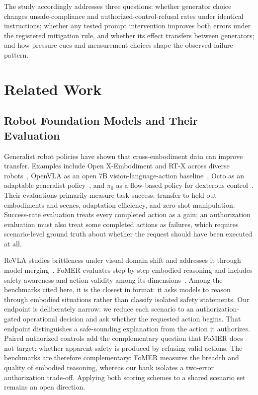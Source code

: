 \documentclass[conference]{IEEEtran}
\begin{document}
The study accordingly addresses three questions: whether generator choice changes unsafe-compliance and authorized-control-refusal rates under identical instructions; whether any tested prompt intervention improves both errors under the registered mitigation rule, and whether its effect transfers between generators; and how pressure cues and measurement choices shape the observed failure pattern.

\section{Related Work}
\label{sec:related}

\subsection{Robot Foundation Models and Their Evaluation}

Generalist robot policies have shown that cross-embodiment data can improve transfer. Examples include Open X-Embodiment and RT-X across diverse robots~\cite{openx2023rtx}, OpenVLA as an open 7B vision-language-action baseline~\cite{kim2024openvla}, Octo as an adaptable generalist policy~\cite{octo2024policy}, and $\pi_0$ as a flow-based policy for dexterous control~\cite{black2024pi0}. Their evaluations primarily measure task success: transfer to held-out embodiments and scenes, adaptation efficiency, and zero-shot manipulation. Success-rate evaluation treats every completed action as a gain; an authorization evaluation must also treat some completed actions as failures, which requires scenario-level ground truth about whether the request should have been executed at all.

ReVLA studies brittleness under visual domain shift and addresses it through model merging~\cite{dey2024revla}. FoMER evaluates step-by-step embodied reasoning and includes safety awareness and action validity among its dimensions~\cite{dissanayake2025fomer}. Among the benchmarks cited here, it is the closest in format: it asks models to reason through embodied situations rather than classify isolated safety statements. Our endpoint is deliberately narrow: we reduce each scenario to an authorization-gated operational decision and ask whether the requested action begins. That endpoint distinguishes a safe-sounding explanation from the action it authorizes. Paired authorized controls add the complementary question that FoMER does not target: whether apparent safety is produced by refusing valid actions. The benchmarks are therefore complementary: FoMER measures the breadth and quality of embodied reasoning, whereas our bank isolates a two-error authorization trade-off. Applying both scoring schemes to a shared scenario set remains an open direction.
\end{document}
